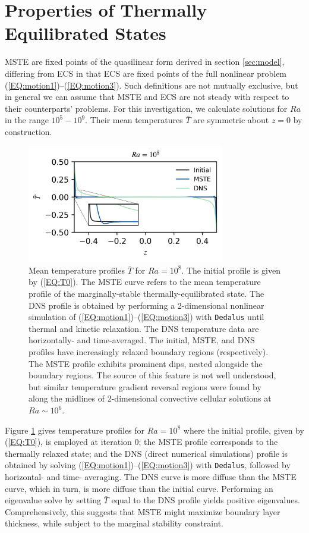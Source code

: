 \documentclass[reprint,amsmath,amssymb,aps]{revtex4-1}
\begin{document}
\section{Properties of Thermally Equilibrated States}\label{sec:properties}
MSTE are fixed points of the quasilinear form derived in section \ref{sec:model}, differing from ECS in that ECS are fixed points of the full nonlinear problem (\ref{EQ:motion1})--(\ref{EQ:motion3}). 
Such definitions are not mutually exclusive, but in general we can assume that MSTE and ECS are not steady with respect to their counterparts' problems.
For this investigation, we calculate solutions for $Ra$ in the range $10^5 - 10^9$. 
Their mean temperatures $\bar{T}$ are symmetric about $z = 0$ by construction. 

\begin{figure}
    \centering
    \includegraphics[width=3.4in]{T_profs_na.png}
    \caption{Mean temperature profiles $\bar{T}$ for $Ra = 10^8$. 
    The initial profile is given by (\ref{EQ:T0}). 
    The MSTE curve refers to the mean temperature profile of the marginally-stable thermally-equilibrated state. 
    The DNS profile is obtained by performing a 2-dimensional nonlinear simulation of (\ref{EQ:motion1})--(\ref{EQ:motion3}) with \texttt{Dedalus} until thermal and kinetic relaxation. 
    The DNS temperature data are horizontally- and time-averaged. 
    The initial, MSTE, and DNS profiles have increasingly relaxed boundary regions (respectively). 
    The MSTE profile exhibits prominent dips, nested alongside the boundary regions. 
    The source of this feature is not well understood, but similar temperature gradient reversal regions were found by \cite{chini_cells} along the midlines of 2-dimensional convective cellular solutions at $Ra \sim 10^6$.}
    \label{fig:T0_profiles}
\end{figure}

Figure \ref{fig:T0_profiles} gives temperature profiles for $Ra = 10^8$ where the initial profile, given by (\ref{EQ:T0}), is employed at iteration 0; the MSTE profile corresponds to the thermally relaxed state; and the DNS (direct numerical simulations) profile is obtained by solving (\ref{EQ:motion1})--(\ref{EQ:motion3}) with \texttt{Dedalus}, followed by horizontal- and time- averaging. 
The DNS curve is more diffuse than the MSTE curve, which in turn, is more diffuse than the initial curve. 
Performing an eigenvalue solve by setting $\bar{T}$ equal to the DNS profile yields positive eigenvalues. 
Comprehensively, this suggests that MSTE might maximize boundary layer thickness, while subject to the marginal stability constraint.
\end{document}
